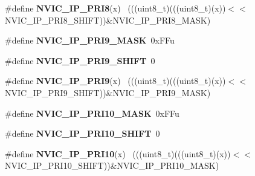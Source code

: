 \begin{DoxyCompactItemize}
\item 
\hypertarget{group___n_v_i_c___register___masks_ga685e449a4a50dfdc12ace814c6ae4287}{}\#define {\bfseries N\+V\+I\+C\+\_\+\+I\+P\+\_\+\+P\+R\+I8}(x)                                                ~(((uint8\+\_\+t)(((uint8\+\_\+t)(x))$<$$<$N\+V\+I\+C\+\_\+\+I\+P\+\_\+\+P\+R\+I8\+\_\+\+S\+H\+I\+F\+T))\&N\+V\+I\+C\+\_\+\+I\+P\+\_\+\+P\+R\+I8\+\_\+\+M\+A\+S\+K)\label{group___n_v_i_c___register___masks_ga685e449a4a50dfdc12ace814c6ae4287}

\item 
\hypertarget{group___n_v_i_c___register___masks_ga06fe99df9fd723b8b3a6dab6707c7ed7}{}\#define {\bfseries N\+V\+I\+C\+\_\+\+I\+P\+\_\+\+P\+R\+I9\+\_\+\+M\+A\+S\+K}~0x\+F\+Fu\label{group___n_v_i_c___register___masks_ga06fe99df9fd723b8b3a6dab6707c7ed7}

\item 
\hypertarget{group___n_v_i_c___register___masks_ga7a8e57f4e3c2631de25758b96e2681da}{}\#define {\bfseries N\+V\+I\+C\+\_\+\+I\+P\+\_\+\+P\+R\+I9\+\_\+\+S\+H\+I\+F\+T}~0\label{group___n_v_i_c___register___masks_ga7a8e57f4e3c2631de25758b96e2681da}

\item 
\hypertarget{group___n_v_i_c___register___masks_ga6fb2304d8a578857a4f32b6c030d7d83}{}\#define {\bfseries N\+V\+I\+C\+\_\+\+I\+P\+\_\+\+P\+R\+I9}(x)                                                ~(((uint8\+\_\+t)(((uint8\+\_\+t)(x))$<$$<$N\+V\+I\+C\+\_\+\+I\+P\+\_\+\+P\+R\+I9\+\_\+\+S\+H\+I\+F\+T))\&N\+V\+I\+C\+\_\+\+I\+P\+\_\+\+P\+R\+I9\+\_\+\+M\+A\+S\+K)\label{group___n_v_i_c___register___masks_ga6fb2304d8a578857a4f32b6c030d7d83}

\item 
\hypertarget{group___n_v_i_c___register___masks_gafff8d9c66138c77e092753f47502b166}{}\#define {\bfseries N\+V\+I\+C\+\_\+\+I\+P\+\_\+\+P\+R\+I10\+\_\+\+M\+A\+S\+K}~0x\+F\+Fu\label{group___n_v_i_c___register___masks_gafff8d9c66138c77e092753f47502b166}

\item 
\hypertarget{group___n_v_i_c___register___masks_ga87794742aeea3f7f2ab52e73e9f9db5d}{}\#define {\bfseries N\+V\+I\+C\+\_\+\+I\+P\+\_\+\+P\+R\+I10\+\_\+\+S\+H\+I\+F\+T}~0\label{group___n_v_i_c___register___masks_ga87794742aeea3f7f2ab52e73e9f9db5d}

\item 
\hypertarget{group___n_v_i_c___register___masks_ga9b71b5fc158fc91d760fff1f6b315247}{}\#define {\bfseries N\+V\+I\+C\+\_\+\+I\+P\+\_\+\+P\+R\+I10}(x)                                              ~(((uint8\+\_\+t)(((uint8\+\_\+t)(x))$<$$<$N\+V\+I\+C\+\_\+\+I\+P\+\_\+\+P\+R\+I10\+\_\+\+S\+H\+I\+F\+T))\&N\+V\+I\+C\+\_\+\+I\+P\+\_\+\+P\+R\+I10\+\_\+\+M\+A\+S\+K)\label{group___n_v_i_c___register___masks_ga9b71b5fc158fc91d760fff1f6b315247}


\end{DoxyCompactItemize}
